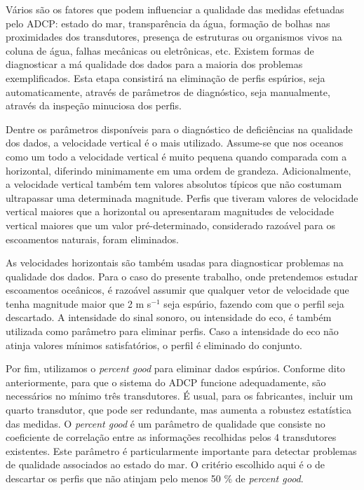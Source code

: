 \hspace{6mm} Vários são os fatores que podem influenciar a qualidade das medidas efetuadas pelo ADCP:
estado do mar, transparência da água, formação de bolhas nas proximidades dos transdutores, presença de
estruturas ou organismos vivos na coluna de água, falhas mecânicas ou eletrônicas, etc. Existem 
formas de diagnosticar a má qualidade dos dados para a maioria dos problemas exemplificados. Esta etapa
consistirá na eliminação de perfis espúrios, seja automaticamente, através de parâmetros de diagnóstico, seja
manualmente, através da inspeção minuciosa dos perfis. 

Dentre os parâmetros disponíveis para o diagnóstico de deficiências na qualidade dos dados, a velocidade vertical
é o mais utilizado. Assume-se que nos oceanos como um todo a velocidade vertical é muito pequena quando comparada
com a horizontal, diferindo minimamente em uma ordem de grandeza. Adicionalmente, a velocidade vertical
também tem valores absolutos típicos que não costumam ultrapassar uma determinada magnitude. Perfis que tiveram valores 
de velocidade vertical maiores que a horizontal ou apresentaram magnitudes de velocidade vertical maiores que um valor 
pré-determinado, considerado razoável para os escoamentos naturais, foram eliminados.

As velocidades horizontais são também usadas para diagnosticar problemas na qualidade dos dados. 
Para o caso do presente trabalho, onde pretendemos estudar escoamentos oceânicos, é razoável assumir que qualquer vetor de 
velocidade que tenha magnitude maior que 2 m s$^{-1}$ seja espúrio, fazendo com que o perfil seja descartado. 
A intensidade do sinal sonoro, ou intensidade do eco, é também utilizada como parâmetro para eliminar perfis.
Caso a intensidade do eco não atinja valores mínimos satisfatórios, o perfil é eliminado do conjunto. 

Por fim, utilizamos o {\it percent good} para eliminar dados espúrios. Conforme dito anteriormente, para que o 
sistema do ADCP funcione adequadamente, são necessários no mínimo três transdutores. É usual, para os fabricantes,
incluir um quarto transdutor, que pode ser redundante, mas aumenta a robustez estatística das medidas. O {\it 
percent good} é um parâmetro de qualidade que consiste no coeficiente de correlação entre as informações
recolhidas pelos 4 transdutores existentes. Este parâmetro é particularmente importante para detectar
problemas de qualidade associados ao estado do mar. O critério escolhido aqui é o de descartar os perfis que 
não atinjam pelo menos 50 \% de {\it percent good}. 

